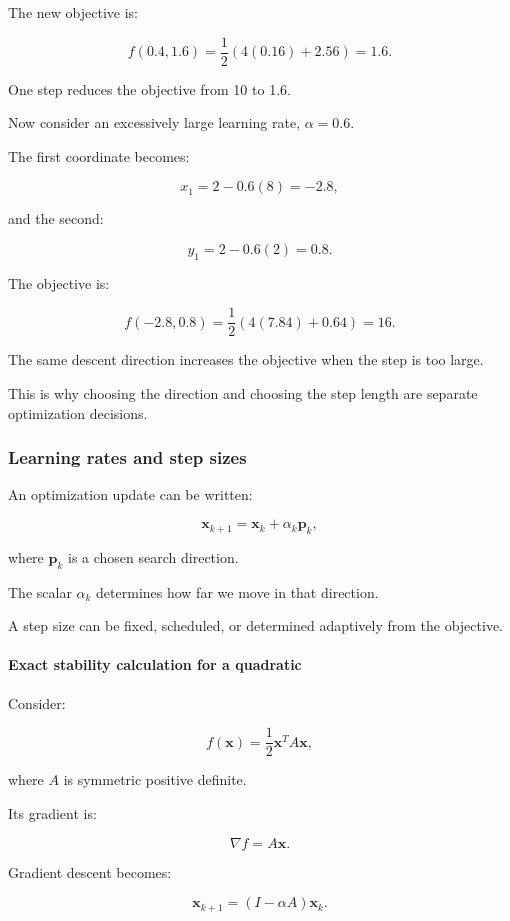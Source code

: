 The new objective is:

\[
f(0.4,1.6) = \frac12(4(0.16)+2.56) =\boxed{1.6}.
\]

One step reduces the objective from 10 to 1.6.

Now consider an excessively large learning rate, \(\alpha=0.6\).

The first coordinate becomes:

\[
x_1=2-0.6(8)=-2.8,
\]

and the second:

\[
y_1=2-0.6(2)=0.8.
\]

The objective is:

\[
f(-2.8,0.8) = \frac12(4(7.84)+0.64) =\boxed{16}.
\]

The same descent direction increases the objective when the step is too large.

This is why choosing the direction and choosing the step length are separate optimization decisions.

\subsubsection{Learning rates and step sizes}\label{02-foundations-ii-ch026-learning-rates-and-step-sizes}

An optimization update can be written:

\[
\mathbf x_{k+1}=\mathbf x_k+\alpha_k\mathbf p_k,
\]

where \(\mathbf p_k\) is a chosen search direction.

The scalar \(\alpha_k\) determines how far we move in that direction.

A step size can be fixed, scheduled, or determined adaptively from the objective.

\paragraph{Exact stability calculation for a quadratic}\label{02-foundations-ii-ch026-exact-stability-calculation-for-a-quadratic}

Consider:

\[
f(\mathbf x)=\frac12\mathbf x^TA\mathbf x,
\]

where \(A\) is symmetric positive definite.

Its gradient is:

\[
\nabla f=A\mathbf x.
\]

Gradient descent becomes:

\[
\mathbf x_{k+1} = (I-\alpha A)\mathbf x_k.
\]

